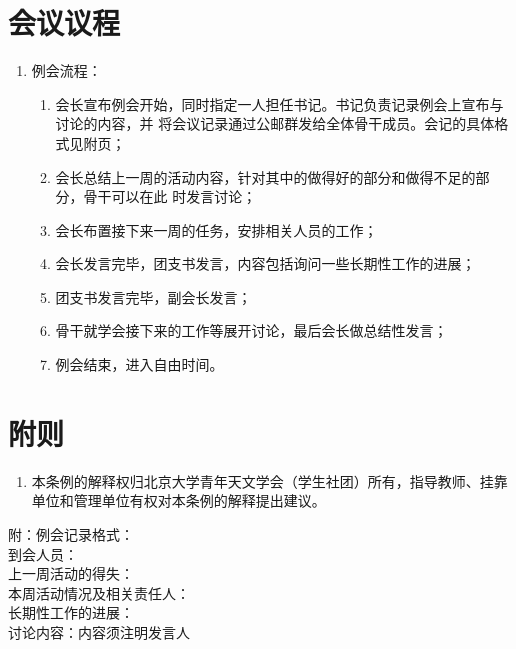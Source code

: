 \section{会议议程}

\begin{enumerate}[resume]
    \item 例会流程：
    
    \begin{enumerate}
        \item 会长宣布例会开始，同时指定一人担任书记。书记负责记录例会上宣布与讨论的内容，并 将会议记录通过公邮群发给全体骨干成员。会记的具体格式见附页；
        \item 会长总结上一周的活动内容，针对其中的做得好的部分和做得不足的部分，骨干可以在此 时发言讨论；
        \item 会长布置接下来一周的任务，安排相关人员的工作；
        \item 会长发言完毕，团支书发言，内容包括询问一些长期性工作的进展；
        \item 团支书发言完毕，副会长发言；
        \item 骨干就学会接下来的工作等展开讨论，最后会长做总结性发言；
        \item 例会结束，进入自由时间。
    \end{enumerate}
\end{enumerate}

\section{附则}

\begin{enumerate}[resume]
    \item 本条例的解释权归北京大学青年天文学会（学生社团）所有，指导教师、挂靠单位和管理单位有权对本条例的解释提出建议。
\end{enumerate}

\noindent 附：例会记录格式：\\
到会人员：\\
上一周活动的得失：\\
本周活动情况及相关责任人：\\
长期性工作的进展：\\
讨论内容：内容须注明发言人
